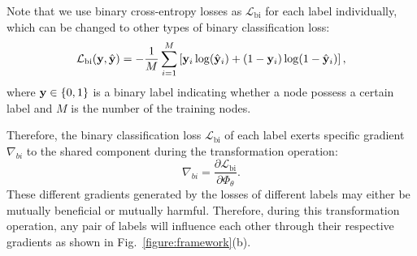 Note that we use binary cross-entropy losses as $\mathcal{L}_{\text{bi}}$ for each label individually, which can be changed to other types of binary classification loss:
\begin{equation} \label{eq:lossBi}
    \mathcal{L}_{\text{bi}}(\mathbf{y}, \hat{\mathbf{y}}) = -\frac{1}{M} \sum_{i=1}^{M} \left[ \mathbf{y}_i \log(\hat{\mathbf{y}}_i) + (1 - \mathbf{y}_i) \log(1 - \hat{\mathbf{y}}_i) \right],
\end{equation}
where $\mathbf{y} \in \{0, 1\}$ is a binary label indicating whether a node possess a certain label and $M$ is the number of the training nodes.

Therefore, the binary classification loss $\mathcal{L}_{\text{bi}}$ of each label exerts specific gradient $\nabla_{bi}$ to the shared component during the transformation operation:
\begin{equation} \label{eq:gradient}
    \nabla_{bi} = \frac{\partial \mathcal{L}_{\text{bi}}}{\partial \Phi_{\theta}}.
\end{equation}
These different gradients generated by the losses of different labels may either be mutually beneficial or mutually harmful. Therefore, during this transformation operation, any pair of labels will influence each other through their respective gradients as shown in Fig.~\ref{figure:framework}(b).

